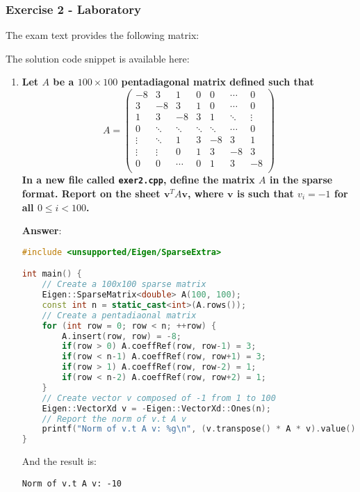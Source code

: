 \newpage

\subsubsection*{Exercise 2 - Laboratory}

The exam text provides the following matrix:
\begin{center}
\end{center}
The solution code snippet is available here:
\begin{center}
    \qrcode{}
\end{center}
\begin{enumerate}[label=\textcolor{Green3}{\textbf{\arabic*.}}]
    \item \textcolor{Green3}{\textbf{%
        Let $A$ be a $100 \times 100$ pentadiagonal matrix defined such that
    }}
    \begin{equation*}
        A = \begin{pmatrix}
            -8 & 3 & 1 & 0 & 0 & \cdots & 0 \\
             3 & -8 & 3 & 1 & 0 & \cdots & 0 \\
             1 & 3 & -8 & 3 & 1 & \ddots & \vdots \\
             0 & \ddots & \ddots & \ddots & \ddots & \cdots & 0 \\
            \vdots & \ddots & 1 & 3 & -8 & 3 & 1 \\
            \vdots & \vdots & 0 & 1 & 3 & -8 & 3 \\
            0 & 0 & \cdots & 0 & 1 & 3 & -8 \\
        \end{pmatrix}
    \end{equation*}
    \textcolor{Green3}{\textbf{In a new file called \texttt{exer2.cpp}, define the matrix $A$ in the sparse format. Report on the sheet $\mathbf{v}^{T} A \mathbf{v}$, where $\mathbf{v}$ is such that $v_{i} = -1$ for all $0 \le i < 100$.}}

    \textbf{Answer}:
    \begin{lstlisting}[language=C++]
#include <unsupported/Eigen/SparseExtra>

int main() {
    // Create a 100x100 sparse matrix
    Eigen::SparseMatrix<double> A(100, 100);
    const int n = static_cast<int>(A.rows());
    // Create a pentadiaonal matrix
    for (int row = 0; row < n; ++row) {
        A.insert(row, row) = -8;
        if(row > 0) A.coeffRef(row, row-1) = 3;
        if(row < n-1) A.coeffRef(row, row+1) = 3;
        if(row > 1) A.coeffRef(row, row-2) = 1;
        if(row < n-2) A.coeffRef(row, row+2) = 1;
    }
    // Create vector v composed of -1 from 1 to 100
    Eigen::VectorXd v = -Eigen::VectorXd::Ones(n);
    // Report the norm of v.t A v
    printf("Norm of v.t A v: %g\n", (v.transpose() * A * v).value());
}\end{lstlisting}
    And the result is:
    \begin{lstlisting}
Norm of v.t A v: -10\end{lstlisting}
\end{enumerate}